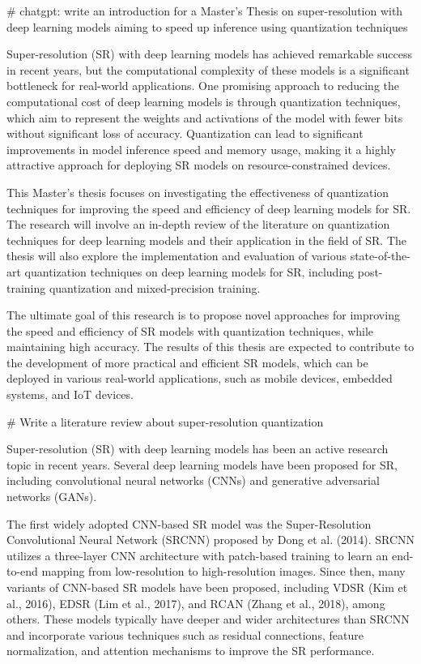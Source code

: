 \label{chap:introduction}

# chatgpt: write an introduction for a Master's Thesis on super-resolution with deep learning models aiming to speed up inference using quantization techniques

Super-resolution (SR) with deep learning models has achieved remarkable success in recent years, but the computational complexity of these models is a significant bottleneck for real-world applications. One promising approach to reducing the computational cost of deep learning models is through quantization techniques, which aim to represent the weights and activations of the model with fewer bits without significant loss of accuracy. Quantization can lead to significant improvements in model inference speed and memory usage, making it a highly attractive approach for deploying SR models on resource-constrained devices.

This Master's thesis focuses on investigating the effectiveness of quantization techniques for improving the speed and efficiency of deep learning models for SR. The research will involve an in-depth review of the literature on quantization techniques for deep learning models and their application in the field of SR. The thesis will also explore the implementation and evaluation of various state-of-the-art quantization techniques on deep learning models for SR, including post-training quantization and mixed-precision training.

The ultimate goal of this research is to propose novel approaches for improving the speed and efficiency of SR models with quantization techniques, while maintaining high accuracy. The results of this thesis are expected to contribute to the development of more practical and efficient SR models, which can be deployed in various real-world applications, such as mobile devices, embedded systems, and IoT devices.

# Write a literature review about super-resolution quantization

Super-resolution (SR) with deep learning models has been an active research topic in recent years. Several deep learning models have been proposed for SR, including convolutional neural networks (CNNs) and generative adversarial networks (GANs).

The first widely adopted CNN-based SR model was the Super-Resolution Convolutional Neural Network (SRCNN) proposed by Dong et al. (2014). SRCNN utilizes a three-layer CNN architecture with patch-based training to learn an end-to-end mapping from low-resolution to high-resolution images. Since then, many variants of CNN-based SR models have been proposed, including VDSR (Kim et al., 2016), EDSR (Lim et al., 2017), and RCAN (Zhang et al., 2018), among others. These models typically have deeper and wider architectures than SRCNN and incorporate various techniques such as residual connections, feature normalization, and attention mechanisms to improve the SR performance.

